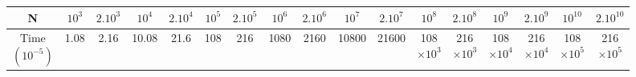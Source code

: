 \vspace{2cm}
\begin{tabular}{|c|c|c|c|c|c|c|c|c|c|c|c|c|c|c|c|c|}
    \hline
    N & \(10^3\) & \(2.10^3\) & \(10^4\) & \(2.10^4\) & \(10^5\) & \(2.10^5\) & \(10^6\) & \(2.10^6\) & \(10^7\) & \(2.10^7\) & \(10^8\) & \(2.10^8\) & \(10^9\) & \(2.10^9\) & \(10^{10}\) & \(2.10^{10}\) \\
    \hline
    \makecell{Time\\\((10^{-5})\)} & 1.08 & 2.16 & 10.08 & 21.6 & 108 & 216 & 1080 & 2160 & 10800 & 21600 & \makecell{108\\\(\times10^3\)} & \makecell{216\\\(\times10^3\)} & \makecell{108\\\(\times10^4\)} & \makecell{216\\\(\times10^4\)} & \makecell{108\\\(\times10^5\)} & \makecell{216\\\(\times10^5\)}\\
    \hline
\end{tabular}

